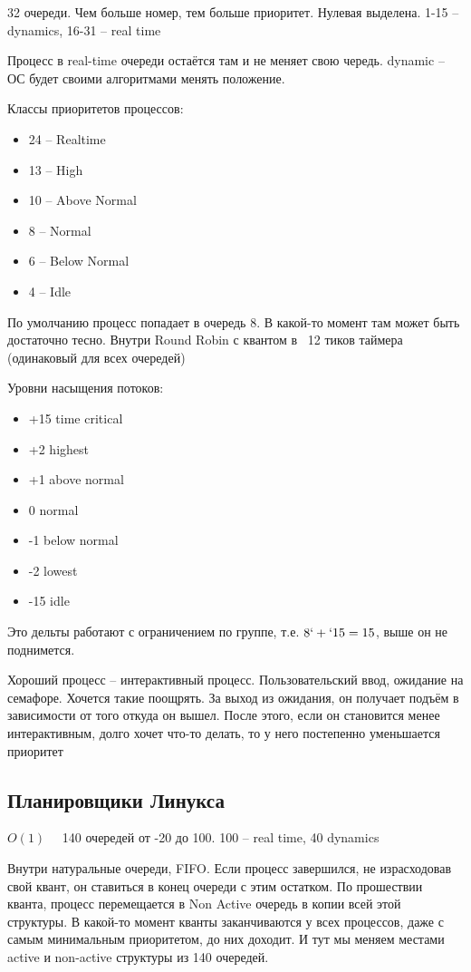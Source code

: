 \documentclass{book}
\theoremstyle{definition}
\begin{document}
32 очереди. Чем больше номер, тем больше приоритет. Нулевая выделена. 1-15 -- dynamics, 16-31 -- real time

Процесс в real-time очереди остаётся там и не меняет свою чередь. dynamic -- ОС будет своими алгоритмами менять положение.

Классы приоритетов процессов:
\begin{itemize}
    \item 24 -- Realtime
    \item 13 -- High
    \item 10 -- Above Normal
    \item 8 -- Normal
    \item 6 -- Below Normal
    \item 4 -- Idle
\end{itemize}

По умолчанию процесс попадает в очередь 8. В какой-то момент там может быть достаточно тесно. Внутри Round Robin с квантом в ~12 тиков таймера (одинаковый для всех очередей)

Уровни насыщения потоков:
\begin{itemize}
    \item +15 time critical
    \item +2 highest
    \item +1 above normal
    \item 0 normal
    \item -1 below normal
    \item -2 lowest
    \item -15 idle
\end{itemize}

Это дельты работают с ограничением по группе, т.е. $8 `+` 15 = 15$, выше он не поднимется.

Хороший процесс -- интерактивный процесс. Пользовательский ввод, ожидание на семафоре. Хочется такие поощрять. За выход из ожидания, он получает подъём в зависимости от того откуда он вышел. После этого, если он становится менее интерактивным, долго хочет что-то делать, то у него постепенно уменьшается приоритет

\subsection{Планировщики Линукса}

$O(1)\quad $ 140 очередей от -20 до 100. 100 -- real time, 40 dynamics

Внутри натуральные очереди, FIFO. Если процесс завершился, не израсходовав свой квант, он ставиться в конец очереди с этим остатком. По прошествии кванта, процесс перемещается в Non Active очередь в копии всей этой структуры. В какой-то момент кванты заканчиваются у всех процессов, даже с самым минимальным приоритетом, до них доходит. И тут мы меняем местами active и non-active структуры из 140 очередей. 
\end{document}
